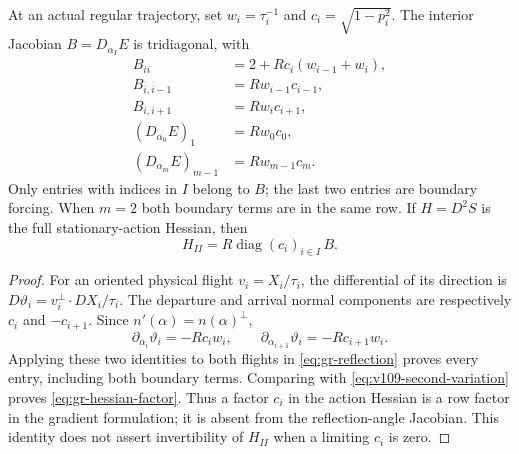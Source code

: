 \begin{lemma}\label{lem:gr-jacobian}
At an actual regular trajectory, set $w_i=\tau_i^{-1}$ and
$c_i=\sqrt{1-p_i^2}$. The interior Jacobian $B=D_{\alpha_I}E$ is
tridiagonal, with
\begin{align}
 B_{ii}&=2+Rc_i(w_{i-1}+w_i),\\
 B_{i,i-1}&=Rw_{i-1}c_{i-1},\\
 B_{i,i+1}&=Rw_ic_{i+1},\\
 (D_{\alpha_0}E)_1&=Rw_0c_0,\\
 (D_{\alpha_m}E)_{m-1}&=Rw_{m-1}c_m.
 \label{eq:gr-jacobian}
\end{align}
Only entries with indices in $I$ belong to $B$; the last two entries
are boundary forcing. When $m=2$ both boundary terms are in the same
row. If $H=D^2S$ is the full stationary-action Hessian, then
\begin{equation}\label{eq:gr-hessian-factor}
 H_{II}=R\operatorname{diag}(c_i)_{i\in I}\,B.
\end{equation}
\end{lemma}
\begin{proof}
For an oriented physical flight $v_i=X_i/\tau_i$, the differential
of its direction is $D\vartheta_i=v_i^\perp\cdot DX_i/\tau_i$.
The departure and arrival normal components are respectively $c_i$
and $-c_{i+1}$. Since $n'(\alpha)=n(\alpha)^\perp$,
\[
 \partial_{\alpha_i}\vartheta_i=-Rc_iw_i,
 \qquad \partial_{\alpha_{i+1}}\vartheta_i=-Rc_{i+1}w_i.
\]
Applying these two identities to both flights in
\eqref{eq:gr-reflection} proves every entry, including both boundary
terms. Comparing with \eqref{eq:v109-second-variation} proves
\eqref{eq:gr-hessian-factor}. Thus a factor $c_i$ in the action Hessian
is a row factor in the gradient formulation; it is absent from the
reflection-angle Jacobian. This identity does not assert invertibility
of $H_{II}$ when a limiting $c_i$ is zero.
\end{proof}

